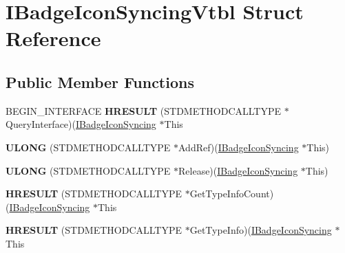 \hypertarget{struct_i_badge_icon_syncing_vtbl}{\section{I\-Badge\-Icon\-Syncing\-Vtbl Struct Reference}
\label{struct_i_badge_icon_syncing_vtbl}
}
\subsection*{Public Member Functions}
\begin{DoxyCompactItemize}
\item 
\hypertarget{struct_i_badge_icon_syncing_vtbl_a85d512803b9826e4005b1a51bdb90e0d}{B\-E\-G\-I\-N\-\_\-\-I\-N\-T\-E\-R\-F\-A\-C\-E {\bfseries H\-R\-E\-S\-U\-L\-T} (S\-T\-D\-M\-E\-T\-H\-O\-D\-C\-A\-L\-L\-T\-Y\-P\-E $\ast$Query\-Interface)(\hyperlink{interface_i_badge_icon_syncing}{I\-Badge\-Icon\-Syncing} $\ast$This}\label{struct_i_badge_icon_syncing_vtbl_a85d512803b9826e4005b1a51bdb90e0d}

\item 
\hypertarget{struct_i_badge_icon_syncing_vtbl_a696fb0dcba89998857a7bda5cbaa0c65}{{\bfseries U\-L\-O\-N\-G} (S\-T\-D\-M\-E\-T\-H\-O\-D\-C\-A\-L\-L\-T\-Y\-P\-E $\ast$Add\-Ref)(\hyperlink{interface_i_badge_icon_syncing}{I\-Badge\-Icon\-Syncing} $\ast$This)}\label{struct_i_badge_icon_syncing_vtbl_a696fb0dcba89998857a7bda5cbaa0c65}

\item 
\hypertarget{struct_i_badge_icon_syncing_vtbl_a3f3a1ac840b7be5acb4d09bb24fe0712}{{\bfseries U\-L\-O\-N\-G} (S\-T\-D\-M\-E\-T\-H\-O\-D\-C\-A\-L\-L\-T\-Y\-P\-E $\ast$Release)(\hyperlink{interface_i_badge_icon_syncing}{I\-Badge\-Icon\-Syncing} $\ast$This)}\label{struct_i_badge_icon_syncing_vtbl_a3f3a1ac840b7be5acb4d09bb24fe0712}

\item 
\hypertarget{struct_i_badge_icon_syncing_vtbl_a684d8fd151bf87227449d06afdb5e631}{{\bfseries H\-R\-E\-S\-U\-L\-T} (S\-T\-D\-M\-E\-T\-H\-O\-D\-C\-A\-L\-L\-T\-Y\-P\-E $\ast$Get\-Type\-Info\-Count)(\hyperlink{interface_i_badge_icon_syncing}{I\-Badge\-Icon\-Syncing} $\ast$This}\label{struct_i_badge_icon_syncing_vtbl_a684d8fd151bf87227449d06afdb5e631}

\item 
\hypertarget{struct_i_badge_icon_syncing_vtbl_af27b5206b588a4954741cfbd3efc1798}{{\bfseries H\-R\-E\-S\-U\-L\-T} (S\-T\-D\-M\-E\-T\-H\-O\-D\-C\-A\-L\-L\-T\-Y\-P\-E $\ast$Get\-Type\-Info)(\hyperlink{interface_i_badge_icon_syncing}{I\-Badge\-Icon\-Syncing} $\ast$This}\label{struct_i_badge_icon_syncing_vtbl_af27b5206b588a4954741cfbd3efc1798}


\end{DoxyCompactItemize}

